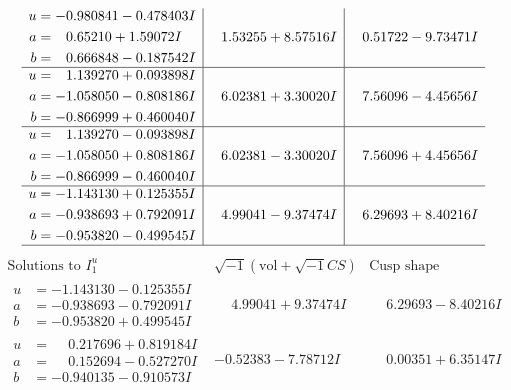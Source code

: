 \documentclass[1p]{elsarticle_modified}
\theoremstyle{definition}
\newcommand{\I}{\sqrt{-1}}
\begin{document}
$$\begin{array}{c|c|c}
\begin{aligned}
u &= -0.980841 - 0.478403 I \\
a &= \phantom{-}0.65210 + 1.59072 I \\
b &= \phantom{-}0.666848 - 0.187542 I\end{aligned}
 & \phantom{-}1.53255 + 8.57516 I & \phantom{-}0.51722 - 9.73471 I \\ \hline\begin{aligned}
u &= \phantom{-}1.139270 + 0.093898 I \\
a &= -1.058050 - 0.808186 I \\
b &= -0.866999 + 0.460040 I\end{aligned}
 & \phantom{-}6.02381 + 3.30020 I & \phantom{-}7.56096 - 4.45656 I \\ \hline\begin{aligned}
u &= \phantom{-}1.139270 - 0.093898 I \\
a &= -1.058050 + 0.808186 I \\
b &= -0.866999 - 0.460040 I\end{aligned}
 & \phantom{-}6.02381 - 3.30020 I & \phantom{-}7.56096 + 4.45656 I \\ \hline\begin{aligned}
u &= -1.143130 + 0.125355 I \\
a &= -0.938693 + 0.792091 I \\
b &= -0.953820 - 0.499545 I\end{aligned}
 & \phantom{-}4.99041 - 9.37474 I & \phantom{-}6.29693 + 8.40216 I\\
 \hline 
 \end{array}$$\newpage$$\begin{array}{c|c|c}  
\text{Solutions to }I^u_{1}& \I (\text{vol} + \sqrt{-1}CS) & \text{Cusp shape}\\
 \hline 
\begin{aligned}
u &= -1.143130 - 0.125355 I \\
a &= -0.938693 - 0.792091 I \\
b &= -0.953820 + 0.499545 I\end{aligned}
 & \phantom{-}4.99041 + 9.37474 I & \phantom{-}6.29693 - 8.40216 I \\ \hline\begin{aligned}
u &= \phantom{-}0.217696 + 0.819184 I \\
a &= \phantom{-}0.152694 - 0.527270 I \\
b &= -0.940135 - 0.910573 I\end{aligned}
 & -0.52383 - 7.78712 I & \phantom{-}0.00351 + 6.35147 I \\ \hline\begin{aligned}

\end{aligned}
\end{array}$$
\end{document}
